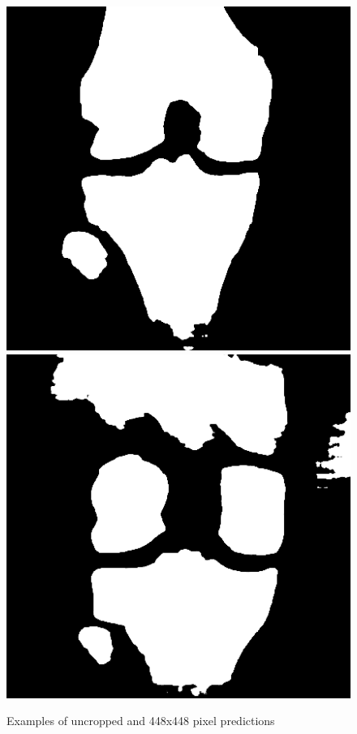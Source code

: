\begin{figure}[H]
\endminipage\hfill
{}%
  \includegraphics[width=\linewidth]{imgs/transfer_size_y3.png}
\endminipage\hfill
{}%
  \includegraphics[width=\linewidth]{imgs/transfer_size_y4.png}
\endminipage
\caption{Examples of uncropped and 448x448 pixel predictions}
\end{figure}


